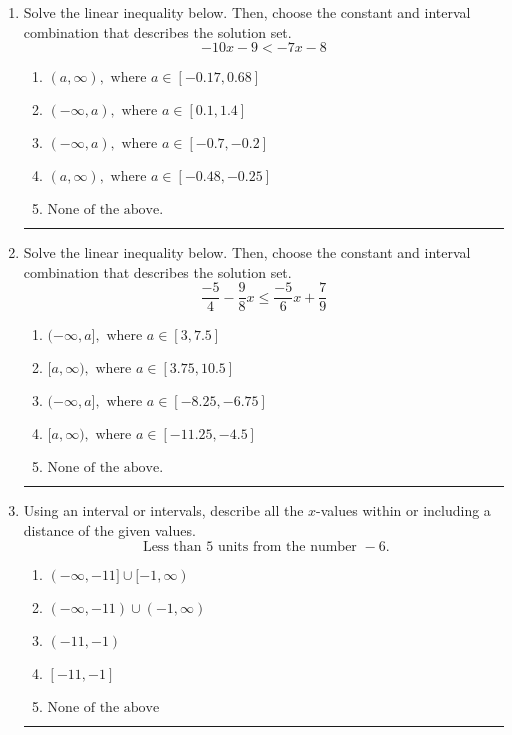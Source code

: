 \documentclass[14pt]{extbook}
\newcommand{\litem}[1]{\item#1\hspace*{-1cm}\rule{\textwidth}{0.4pt}}
\begin{document}
\begin{enumerate}
{\begin{enumerate}[label=\Alph*.]
\end{enumerate} }
\litem{
Solve the linear inequality below. Then, choose the constant and interval combination that describes the solution set.\[ -10x -9 < -7x -8 \]\begin{enumerate}[label=\Alph*.]
\item \( (a, \infty), \text{ where } a \in [-0.17, 0.68] \)
\item \( (-\infty, a), \text{ where } a \in [0.1, 1.4] \)
\item \( (-\infty, a), \text{ where } a \in [-0.7, -0.2] \)
\item \( (a, \infty), \text{ where } a \in [-0.48, -0.25] \)
\item \( \text{None of the above}. \)

\end{enumerate} }
\litem{
Solve the linear inequality below. Then, choose the constant and interval combination that describes the solution set.\[ \frac{-5}{4} - \frac{9}{8} x \leq \frac{-5}{6} x + \frac{7}{9} \]\begin{enumerate}[label=\Alph*.]
\item \( (-\infty, a], \text{ where } a \in [3, 7.5] \)
\item \( [a, \infty), \text{ where } a \in [3.75, 10.5] \)
\item \( (-\infty, a], \text{ where } a \in [-8.25, -6.75] \)
\item \( [a, \infty), \text{ where } a \in [-11.25, -4.5] \)
\item \( \text{None of the above}. \)

\end{enumerate} }
\litem{
Using an interval or intervals, describe all the $x$-values within or including a distance of the given values.\[ \text{ Less than } 5 \text{ units from the number } -6. \]\begin{enumerate}[label=\Alph*.]
\item \( (-\infty, -11] \cup [-1, \infty) \)
\item \( (-\infty, -11) \cup (-1, \infty) \)
\item \( (-11, -1) \)
\item \( [-11, -1] \)
\item \( \text{None of the above} \)


\end{enumerate}}
\end{enumerate}
\end{document}
